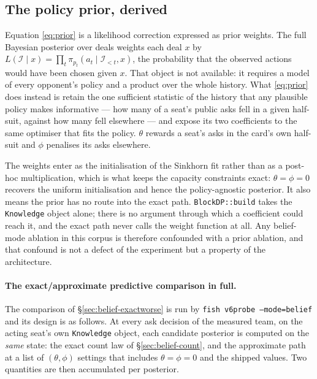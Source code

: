 \subsection{The policy prior, derived}
\label{app:inf-prior}

Equation \eqref{eq:prior} is a likelihood correction expressed as prior weights.
The full Bayesian posterior over deals weights each deal $x$ by $L(\mathcal{I}
\mid x) = \prod_t \pi_{p_t}(a_t \mid \mathcal{I}_{<t}, x)$, the probability that
the observed actions would have been chosen given $x$. That object is not
available: it requires a model of every opponent's policy and a product over the
whole history. What \eqref{eq:prior} does instead is retain the one sufficient
statistic of the history that any plausible policy makes informative --- how many
of a seat's public asks fell in a given half-suit, against how many fell
elsewhere --- and expose its two coefficients to the same optimiser that fits the
policy. $\theta$ rewards a seat's asks in the card's own half-suit and $\phi$
penalises its asks elsewhere.

The weights enter as the initialisation of the Sinkhorn fit rather than as a
post-hoc multiplication, which is what keeps the capacity constraints exact:
$\theta = \phi = 0$ recovers the uniform initialisation and hence the
policy-agnostic posterior. It also means the prior has no route into the exact
path. \texttt{BlockDP::build} takes the \texttt{Knowledge} object alone; there is
no argument through which a coefficient could reach it, and the exact path never
calls the weight function at all. Any belief-mode ablation in this corpus is
therefore confounded with a prior ablation, and that confound is not a defect of
the experiment but a property of the architecture.

\paragraph{The exact/approximate predictive comparison in full.} The comparison
of \S\ref{sec:belief-exactworse} is run by \texttt{fish v6probe --mode=belief}
and its design is as follows. At every ask decision of the measured team, on the
acting seat's own \texttt{Knowledge} object, each candidate posterior is computed
on the \emph{same} state: the exact count law of \S\ref{sec:belief-count}, and
the approximate path at a list of $(\theta,\phi)$ settings that includes $\theta =
\phi = 0$ and the shipped values. Two quantities are then accumulated per
posterior.


